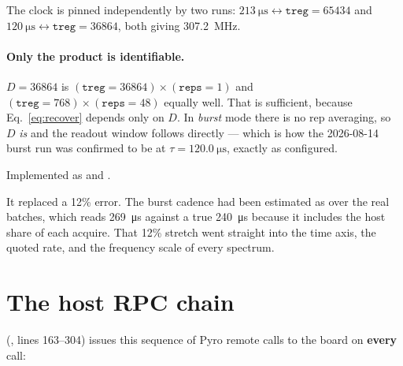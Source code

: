 The clock is pinned independently by two runs:
$\SI{213}{\micro\second}\leftrightarrow\texttt{treg}=65434$ and
$\SI{120}{\micro\second}\leftrightarrow\texttt{treg}=36864$, both giving
\SI{307.2}{\mega\hertz}.

\paragraph{Only the product is identifiable.} $D=36864$ is
$(\texttt{treg}=36864)\times(\texttt{reps}=1)$ and
$(\texttt{treg}=768)\times(\texttt{reps}=48)$ equally well. That is sufficient,
because Eq.~\ref{eq:recover} depends only on $D$. In \emph{burst} mode there is
no rep averaging, so $D$ \emph{is}  and the readout window follows
directly --- which is how the 2026-08-14 burst run was confirmed to be at
$\tau=\SI{120.0}{\micro\second}$, exactly as configured.

Implemented as  and
.

\begin{keybox}
It replaced a 12\% error. The burst cadence had been estimated as
 over the real batches, which reads
\SI{269}{\micro\second} against a true \SI{240}{\micro\second} because it
includes the host share of each acquire. That 12\% stretch went straight into the
time axis, the quoted rate, and the frequency scale of every spectrum.
\end{keybox}

\section{The host RPC chain}
\label{sec:rpc}

(, lines 163--304) issues this
sequence of Pyro remote calls to the board on \textbf{every} call:

